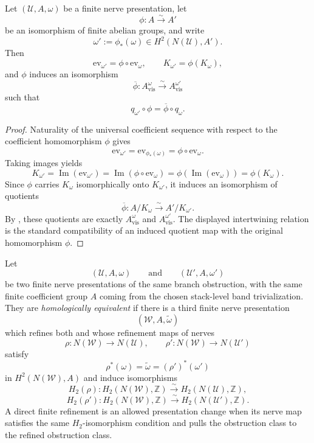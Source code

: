 \begin{proposition}\label{prop:visible-quotient-coefficient-transport}
Let $(\mathcal U,A,\omega)$ be a finite nerve presentation, let
\[
\phi:A\xrightarrow{\sim} A'
\]
be an isomorphism of finite abelian groups, and write
\[
\omega':=\phi_*(\omega)\in H^2(N(\mathcal U),A').
\]
Then
\[
\mathrm{ev}_{\omega'}=\phi\circ \mathrm{ev}_{\omega},
\qquad
K_{\omega'}=\phi(K_{\omega}),
\]
and $\phi$ induces an isomorphism
\[
\overline\phi:A_{\mathrm{vis}}^{\omega}\xrightarrow{\sim}A_{\mathrm{vis}}^{\omega'}
\]
such that
\[
q_{\omega'}\circ \phi=\overline\phi\circ q_{\omega}.
\]
\end{proposition}

\begin{proof}
Naturality of the universal coefficient sequence with respect to the
coefficient homomorphism $\phi$ gives
\[
\mathrm{ev}_{\omega'}=\mathrm{ev}_{\phi_*(\omega)}=\phi\circ \mathrm{ev}_{\omega}.
\]
Taking images yields
\[
K_{\omega'}=\operatorname{Im}(\mathrm{ev}_{\omega'})
=\operatorname{Im}(\phi\circ \mathrm{ev}_{\omega})
=\phi(\operatorname{Im}(\mathrm{ev}_{\omega}))
=\phi(K_{\omega}).
\]
Since $\phi$ carries $K_{\omega}$ isomorphically onto $K_{\omega'}$, it
induces an isomorphism of quotients
\[
\overline\phi:A/K_{\omega}\xrightarrow{\sim}A'/K_{\omega'}.
\]
By , these quotients are exactly
$A_{\mathrm{vis}}^{\omega}$ and $A_{\mathrm{vis}}^{\omega'}$. The displayed
intertwining relation is the standard compatibility of an induced quotient map
with the original homomorphism $\phi$.
\end{proof}

\begin{definition}\label{def:homologically-equivalent-finite-presentations}
Let
\[
(\mathcal U,A,\omega)
\qquad\text{and}\qquad
(\mathcal U',A,\omega')
\]
be two finite nerve presentations of the same branch obstruction, with the same
finite coefficient group $A$ coming from the chosen stack-level band
trivialization. They are \emph{homologically equivalent} if there is a third
finite nerve presentation
\[
(\mathcal W,A,\widetilde\omega)
\]
which refines both and whose refinement maps of nerves
\[
\rho:N(\mathcal W)\longrightarrow N(\mathcal U),
\qquad
\rho':N(\mathcal W)\longrightarrow N(\mathcal U')
\]
satisfy
\[
\rho^*(\omega)=\widetilde\omega=(\rho')^*(\omega')
\]
in $H^2(N(\mathcal W),A)$ and induce isomorphisms
\[
H_2(\rho):H_2(N(\mathcal W),\mathbb Z)\xrightarrow{\sim}
H_2(N(\mathcal U),\mathbb Z),
\]
\[
H_2(\rho'):H_2(N(\mathcal W),\mathbb Z)\xrightarrow{\sim}
H_2(N(\mathcal U'),\mathbb Z).
\]
A direct finite refinement is an allowed presentation change when its nerve map
satisfies the same $H_2$-isomorphism condition and pulls the obstruction class
to the refined obstruction class.
\end{definition}

